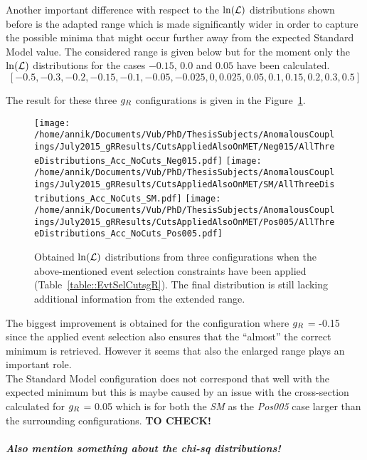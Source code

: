 Another important difference with respect to the $\ln(\mathcal{L})$ distributions shown before is the adapted range which is made significantly wider in order to capture the possible minima that might occur further away from the expected Standard Model value. The considered range is given below but for the moment only the $\ln(\mathcal{L})$ distributions for the cases $-0.15$, $0.0$ and $0.05$ have been calculated.
\begin{equation}\label{eq::FullgRRange}
 \left[-0.5, -0.3, -0.2, -0.15, -0.1, -0.05, -0.025, 0, 0.025, 0.05, 0.1, 0.15, 0.2, 0.3, 0.5 \right]
\end{equation}

The result for these three $g_{R}$ configurations is given in the Figure~\ref{fig::gRAllCuts}.
\begin{figure}[h!t]
 \centering
 \texttt{[image: /home/annik/Documents/Vub/PhD/ThesisSubjects/AnomalousCouplings/July2015\_gRResults/CutsAppliedAlsoOnMET/Neg015/AllThreeDistributions\_Acc\_NoCuts\_Neg015.pdf]}
 \texttt{[image: /home/annik/Documents/Vub/PhD/ThesisSubjects/AnomalousCouplings/July2015\_gRResults/CutsAppliedAlsoOnMET/SM/AllThreeDistributions\_Acc\_NoCuts\_SM.pdf]}
 \texttt{[image: /home/annik/Documents/Vub/PhD/ThesisSubjects/AnomalousCouplings/July2015\_gRResults/CutsAppliedAlsoOnMET/Pos005/AllThreeDistributions\_Acc\_NoCuts\_Pos005.pdf]}
 \caption{Obtained $\ln(\mathcal{L})$ distributions from three configurations when the above-mentioned event selection constraints have been applied (Table~\ref{table::EvtSelCutsgR}). The final distribution is still lacking additional information from the extended range.}
 \label{fig::gRAllCuts}
\end{figure}

The biggest improvement is obtained for the configuration where $g_{R}$ = -0.15 since the applied event selection also ensures that the ``almost'' the correct minimum is retrieved. However it seems that also the enlarged range plays an important role.
\\
The Standard Model configuration does not correspond that well with the expected minimum but this is maybe caused by an issue with the cross-section calculated for $g_{R}$ = 0.05 which is for both the \textit{SM} as the \textit{Pos005} case larger than the surrounding configurations. \textbf{TO CHECK!}\\
\\
\textit{\textbf{Also mention something about the chi-sq distributions!}}

